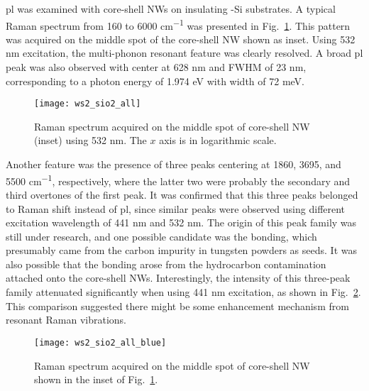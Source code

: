 \Gls{pl} was examined with core-shell NWs on insulating -Si substrates. A typical Raman spectrum from 160 to 6000 \si{cm^{-1}} was presented in Fig.~\ref{fig:ws2ramall}. This pattern was acquired on the middle spot of the core-shell NW shown as inset. Using 532 nm excitation, the multi-phonon resonant feature was clearly resolved. A broad \gls{pl} peak was also observed with center at 628 nm and FWHM of 23 nm, corresponding to a photon energy of 1.974 eV with width of 72 meV.  
\begin{figure}[htb]
\centering
\texttt{[image: ws2\_sio2\_all]}
\caption[Raman spectrum on the middle spot of core-shell NW]{Raman spectrum acquired on the middle spot of core-shell NW (inset) using 532 nm. The $x$ axis is in logarithmic scale.}
\label{fig:ws2ramall}
\end{figure}
Another feature was the presence of three peaks centering at 1860, 3695, and 5500 \si{cm^{-1}}, respectively, where the latter two were probably the secondary and third overtones of the first peak. It was confirmed that this three peaks belonged to Raman shift instead of \gls{pl}, since similar peaks were observed using different excitation wavelength of 441 nm and 532 nm. The origin of this peak family was still under research, and one possible candidate was the  bonding, which presumably came from the carbon impurity in tungsten powders as seeds. It was also possible that the  bonding arose from the hydrocarbon contamination attached onto the core-shell NWs. Interestingly, the intensity of this three-peak family attenuated significantly when using 441 nm excitation, as shown in Fig.~\ref{fig:ws2ramblue}. This comparison suggested there might be some enhancement mechanism from  resonant Raman vibrations. 
\begin{figure}[htb]
\centering
\texttt{[image: ws2\_sio2\_all\_blue]}
\caption[Raman spectrum acquired on the middle spot]{Raman spectrum acquired on the middle spot of core-shell NW shown in the inset of Fig.~\ref{fig:ws2ramall}.}
\label{fig:ws2ramblue}
\end{figure}

